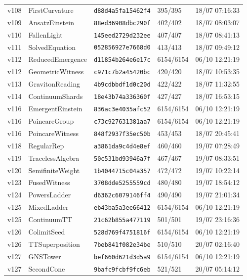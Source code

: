 \documentclass[11pt]{article}
\theoremstyle{definition}\newtheorem{deriv}{Derivation}
\begin{document}
{\begin{longtable}{@{}lllll@{}}
v108 & FirstCurvature & \texttt{d88d4a5fa15462f4} & 395/395 & 18/07 07:16:33 \\
v109 & AnsatzEinstein & \texttt{88ed36908dbc290f} & 402/402 & 18/07 08:03:07 \\
v110 & FallenLight & \texttt{145eed2729d232ee} & 407/407 & 18/07 08:41:13 \\
v111 & SolvedEquation & \texttt{052856927e7668d0} & 413/413 & 18/07 09:49:12 \\
v112 & ReducedEmergence & \texttt{d11854b264e6e17c} & 6154/6154 & 06/10 12:21:19 \\
v112 & GeometricWitness & \texttt{c971c7b2a45420bc} & 420/420 & 18/07 10:53:35 \\
v113 & GravitonReading & \texttt{4b9cdbbdf1d0c20d} & 422/422 & 18/07 11:32:55 \\
v114 & ContinuumShards & \texttt{18e43b74a336360f} & 427/427 & 18/07 16:53:15 \\
v116 & EmergentEinstein & \texttt{836ac3e4035afc52} & 6154/6154 & 06/10 12:21:19 \\
v116 & PoincareGroup & \texttt{c73c927631381aa7} & 6154/6154 & 06/10 12:21:19 \\
v116 & PoincareWitness & \texttt{848f2937f35ec50b} & 453/453 & 18/07 20:45:41 \\
v118 & RegularRep & \texttt{a3861da9c4d4e8ef} & 460/460 & 19/07 07:28:49 \\
v119 & TracelessAlgebra & \texttt{50c531bd93946a7f} & 467/467 & 19/07 08:33:51 \\
v120 & SemifiniteWeight & \texttt{1b4044715c04a357} & 472/472 & 19/07 10:22:14 \\
v123 & FusedWitness & \texttt{3708dde5255559cd} & 480/480 & 19/07 18:54:12 \\
v124 & PowersLadder & \texttt{d6362c6079146ff4} & 490/490 & 19/07 21:01:34 \\
v125 & MixedLadder & \texttt{eb43ba5a3ee66412} & 6154/6154 & 06/10 12:21:19 \\
v125 & ContinuumTT & \texttt{21c62b855a477119} & 501/501 & 19/07 23:16:36 \\
v126 & ColimitSeed & \texttt{528d769f4751816f} & 6154/6154 & 06/10 12:21:19 \\
v126 & TTSuperposition & \texttt{7beb841f082e34be} & 510/510 & 20/07 02:16:40 \\
v127 & GNSTower & \texttt{bef660d621d3d5a9} & 6154/6154 & 06/10 12:21:19 \\
v127 & SecondCone & \texttt{9bafc9fcbf9fc6eb} & 521/521 & 20/07 05:14:12 \\

\end{longtable}}
\end{document}
